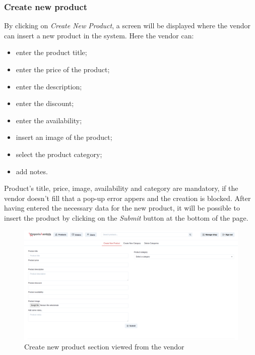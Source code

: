 \subsubsection{Create new product}
By clicking on \textit{Create New Product}, a screen will be displayed where the vendor can insert a new product in the system. Here the vendor can:
\begin{itemize}
    \item enter the product title;
    \item enter the price of the product;
    \item enter the description;
    \item enter the discount;
    \item enter the availability;
    \item insert an image of the product;
    \item select the product category;
    \item add notes.
\end{itemize}
Product's title, price, image, availability and category are mandatory, if the vendor doesn't fill that a pop-up error appers and the creation is blocked.
After having entered the necessary data for the new product, it will be possible to insert the product by clicking on the \textit{Submit} button at the bottom of the page.
\begin{figure}[!ht]
    \caption{Create new product section viewed from the vendor}
    \vspace{5px}
    \includegraphics[scale=0.25]{../../../../Images/userManual/createNewProductVendor.png}
    \centering
\end{figure}
\pagebreak
